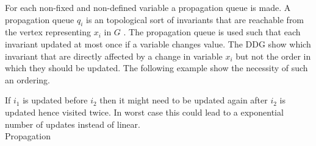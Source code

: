 For each non-fixed and non-defined variable a propagation queue is made. A propagation queue $q_i$ is an topological 
sort of invariants that are reachable from the vertex representing $x_i$ in $G$ . The 
propagation queue is used such that each invariant updated at most once if a variable changes value. The DDG show which 
invariant that are directly affected by a change in variable $x_i$ but not the order in which they should be updated. 
The following example show the necessity of such an ordering. 
\begin{center}
\end{center}
If $i_1$ is updated before $i_2$ then it might need to be updated again after $i_2$ is updated hence visited twice. In 
worst case this could lead to a exponential number of updates instead of linear. \\ 
Propagation 